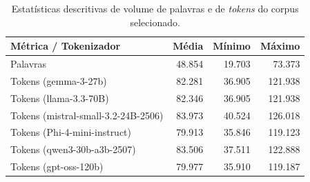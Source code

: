 \begin{table}[htbp]
\centering
\caption{Estatísticas descritivas de volume de palavras e de \textit{tokens} do corpus selecionado.}
\label{tab:estatistica_corpus}
\begin{tabular}{lrrr}
\toprule
\textbf{Métrica / Tokenizador} & \textbf{Média} & \textbf{Mínimo} & \textbf{Máximo} \\
\midrule
Palavras & 48.854 & 19.703 & 73.373 \\
Tokens (gemma-3-27b) & 82.281 & 36.905 & 121.938 \\
Tokens (llama-3.3-70B) & 82.346 & 36.905 & 121.938 \\
Tokens (mistral-small-3.2-24B-2506) & 83.973 & 40.524 & 126.018 \\
Tokens (Phi-4-mini-instruct) & 79.913 & 35.846 & 119.123 \\
Tokens (qwen3-30b-a3b-2507) & 83.506 & 37.511 & 122.888 \\
Tokens (gpt-oss-120b) & 79.977 & 35.910 & 119.187 \\
\bottomrule
\end{tabular}
\end{table}
